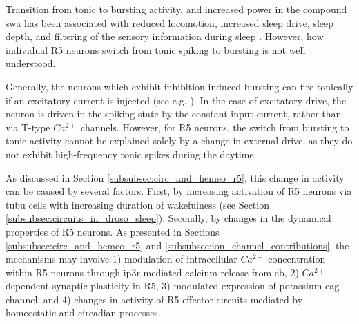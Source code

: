 \documentclass[../main.tex]{subfiles}
\begin{document}
Transition from tonic to bursting activity, and increased power in the compound \gls{swa} has been associated with reduced locomotion, increased sleep drive, sleep depth, and filtering of the sensory information during sleep
\cite{liuSleepDriveEncoded2016,raccugliaNetworkSpecificSynchronizationElectrical2019,
raccugliaCoherentMultilevelNetwork2022,suarez-grimaltNeuralArchitectureSleep2021}.
However, how individual R5 neurons switch from tonic spiking to bursting is not well understood.

Generally, the neurons which exhibit inhibition-induced bursting can fire tonically if an excitatory current is injected (see e.g. \cite{wangMultipleDynamicalModes1994}).
In the case of excitatory drive, the neuron is driven in the spiking state by the constant input current, rather than via T-type $Ca^{2+}$ channels. However, for R5 neurons, the switch from bursting to tonic activity cannot be explained solely by a change in external drive, as they do not exhibit high-frequency tonic spikes during the daytime.

As discussed in Section \ref{subsubsec:circ_and_hemeo_r5}, this change in activity can be caused by several factors. First, by increasing activation of R5 neurons via \gls{tubu} cells with increasing duration of wakefulness (see Section \ref{subsubsec:circuits_in_droso_sleep}). Secondly, by changes in the dynamical properties of R5 neurons. As presented in Sections \ref{subsubsec:circ_and_hemeo_r5} and \ref{subsubsec:ion_channel_contributions}, the mechanisms may involve 1) modulation of intracellular $Ca^{2+}$ concentration within R5 neurons through \gls{ip3r}-mediated calcium release from \gls{eb}, 2) $Ca^{2+}$-dependent synaptic plasticity in R5, 3) modulated expression of potassium \gls{eag} channel, and 4) changes in activity of R5 effector circuits mediated by homeostatic and circadian processes.

\end{document}
